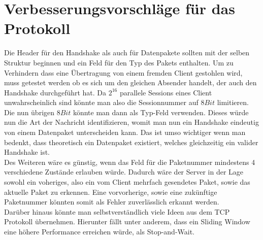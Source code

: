 \chapter{Verbesserungsvorschläge für das Protokoll}

Die Header für den Handshake als auch für Datenpakete sollten mit der selben Struktur beginnen und ein Feld für den Typ des Pakets enthalten.
Um zu Verhindern dass eine Übertragung von einem fremden Client gestohlen wird, muss getestet werden ob es sich um den gleichen Absender handelt, der auch den Handshake durchgeführt hat.
Da \(2^16\) parallele Sessions eines Client unwahrscheinlich sind könnte man also die Sessionnummer auf \(8Bit\) limitieren.
Die nun übrigen \(8Bit\) könnte man dann als Typ-Feld verwenden.
Dieses würde nun die Art der Nachricht identifizieren, womit man nun ein Handshake eindeutig von einem Datenpaket unterscheiden kann.
Das ist umso wichtiger wenn man bedenkt, dass theoretisch ein Datenpaket existiert, welches gleichzeitig ein valider Handshake ist. \\

Des Weiteren wäre es günstig, wenn das Feld für die Paketnummer mindestens 4 verschiedene Zustände erlauben würde.
Dadurch wäre der Server in der Lage sowohl ein voheriges, also ein vom Client mehrfach gesendetes Paket, sowie das aktuelle Paket zu erkennen.
Eine vorvorherige, sowie eine zukünftige Paketnummer könnten somit als Fehler zuverlässlich erkannt werden. \\

Darüber hinaus könnte man selbstverständlich viele Ideen aus dem TCP Protokoll übernehmen.
Hierunter fällt unter anderem, dass ein Sliding Window eine höhere Performance erreichen würde, als Stop-and-Wait.


